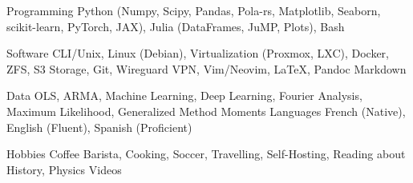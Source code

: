 

\begin{cvskills}

	\cvskill
	{Programming} %
	{Python (Numpy, Scipy, Pandas, Pola-rs, Matplotlib, Seaborn, scikit-learn, PyTorch, JAX), Julia (DataFrames, JuMP, Plots), Bash} %

	\cvskill
	{Software}
	{CLI/Unix, Linux (Debian), Virtualization (Proxmox, LXC), Docker, ZFS, S3 Storage, Git, Wireguard VPN, Vim/Neovim, \LaTeX, Pandoc Markdown}

	\cvskill
	{Data}
	{OLS, ARMA, Machine Learning, Deep Learning, Fourier Analysis, Maximum Likelihood, Generalized Method Moments}
	\cvskill
	{Languages} %
	{French (Native), English (Fluent), Spanish (Proficient)} %

	\cvskill
	{Hobbies}
	{Coffee Barista, Cooking, Soccer, Travelling, Self-Hosting, Reading about History, Physics Videos}
\end{cvskills}
